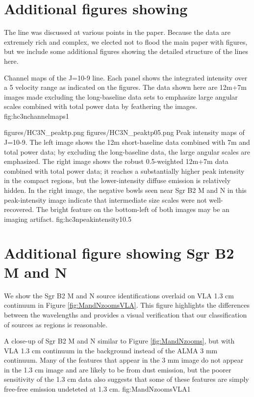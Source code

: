 \documentclass[twocolumn]{aastex61}
\begin{document}
\section{Additional figures showing \cyanoacetylene}
The \cyanoacetylene line was discussed at various points in the paper.  Because
the data are extremely rich and complex, we elected not to flood the main paper
with figures, but we include some additional figures showing the detailed
structure of the lines here.

{Channel maps of the \cyanoacetylene J=10-9 line.  Each panel shows the integrated
intensity over a 5 \kms velocity range as indicated on the figures.
The data shown here are 
12m+7m images made excluding the long-baseline data sets to emphasize
large angular scales
combined with total power
data by feathering the images.}
{fig:hc3nchannelmaps}{1}{\textwidth}

\FigureTwo
{figures/HC3N_peaktp.png}
{figures/HC3N_peaktp05.png}
{Peak intensity maps of \cyanoacetylene J=10-9.
The left image shows the 12m short-baseline data combined with 7m and total
power data; by excluding the long-baseline data, the large angular scales are
emphasized.  The right image shows the robust 0.5-weighted 12m+7m data combined
with total power data;
it reaches a substantially higher peak intensity in the compact regions, but
the lower-intensity diffuse emission is relatively hidden.  In the right image,
the negative bowls seen near Sgr B2 M and N in this peak-intensity image
indicate that intermediate size scales were not well-recovered.  The bright
feature on the bottom-left of both images may be an imaging artifact.}
{fig:hc3npeakintensity}{1}{0.5\textwidth}

\section{Additional figure showing Sgr B2 M and N}
We show the Sgr B2 M and N source identifications overlaid on VLA 1.3 cm
continuum \citep{de-Pree2014a} in Figure \ref{fig:MandNzoomsVLA}.  This figure
highlights the differences between the wavelengths and provides a visual
verification that our classification of sources as \hii regions is reasonable.

{A close-up of Sgr B2 M and N similar to Figure \ref{fig:MandNzooms}, but with
VLA 1.3 cm continuum \citep{de-Pree2014a} in the background instead of the ALMA 3 mm
continuum.  Many of the features that appear in the 3 mm image do not appear
in the 1.3 cm image and are likely to be from dust emission, but the poorer sensitivity
of the 1.3 cm data also suggests that some of these features are simply 
free-free emission undeteted at 1.3 cm.}
{fig:MandNzoomsVLA}{1}{\textwidth}
\end{document}
